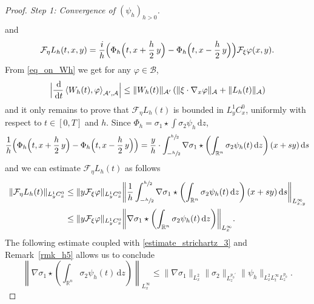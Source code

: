 \documentclass[10pt]{amsart}
\theoremstyle{definition}
\newcommand{\R}{\mathbb{R}}
\newcommand{\ud}{\, {\mathrm{d}}}
\begin{document}
\begin{proof}[Proof. Step 1: Convergence of $(\psi_{h})_{h>0}$]
\begin{align*}
\end{align*}
and
\[
\mathcal{F}_{\eta}L_{h}(t,x,y)=\frac{i}{h}\Bigl(\Phi_{h}\Bigl(t,x+\frac{h}{2}\,y\Bigr)-\Phi_{h}\Bigl(t,x-\frac{h}{2}\,y\Bigr)\Bigr)\mathcal{F}_{\xi}\varphi(x,y).
\]
From \eqref{eq_on_Wh} we get for any $\varphi\in\mathcal{B}$,
\[
\Bigl|\frac{\ud}{\ud t}\left\langle W_{h}(t),\varphi\right\rangle_{\mathcal{A}',\mathcal{A}}\Bigr|\leq\|W_{h}(t)\|_{\mathcal{A}'}\left(\|\xi\cdot\nabla_{x}\varphi\|_{\mathcal{A}}+\|L_{h}(t)\|_{\mathcal{A}}\right)
\]
and it only remains to prove that $\mathcal{F}_{\eta}L_{h}(t)$ is bounded in $L_{y}^{1}C_{x}^{0}$, uniformly with respect to $t\in[0,T]$ and $h$. Since $\Phi_{h}=\sigma_{1}\star\int\sigma_{2}\psi_{h}\ud z$,
\[
\frac{1}{h}\Bigl(\Phi_{h}\Bigl(t,x+\frac{h}{2}\,y\Bigr)-\Phi_{h}\Bigl(t,x-\frac{h}{2}\,y\Bigr)\Bigr)=\frac{y}{h}\cdot\int_{-\sfrac{h}{2}}^{\sfrac{h}{2}}\nabla\sigma_{1}\star\left(\int_{\R^{n}}\sigma_{2}\psi_{h}(t)\ud z\right)(x+sy)\ud s
\]
and we can estimate $\mathcal{F}_{\eta}L_{h}(t)$ as follows
\begin{align*}
\|\mathcal{F}_{\eta}L_{h}(t)\|_{L_{y}^{1}C_{x}^{0}}&\leq\|y\mathcal{F}_{\xi}\varphi\|_{L_{y}^{1}C_{x}^{0}}\biggl\|\frac{1}{h}\int_{-\sfrac{h}{2}}^{\sfrac{h}{2}}\nabla\sigma_{1}\star\left(\int_{\R^{n}}\sigma_{2}\psi_{h}(t)\ud z\right)(x+sy)\ud s\biggr\|_{L_{x,y}^{\infty}}\\
&\leq\|y\mathcal{F}_{\xi}\varphi\|_{L_{y}^{1}C_{x}^{0}}\biggl\|\nabla\sigma_{1}\star\left(\int_{\R^{n}}\sigma_{2}\psi_{h}(t)\ud z\right)\biggr\|_{L_{x}^{\infty}}.
\end{align*}
The following estimate coupled with \eqref{estimate_strichartz_3} and Remark~\ref{rmk_h5} allows us to conclude
\[
\left\|\nabla\sigma_{1}\star\left(\int_{\R^{n}}\sigma_{2}\psi_{h}(t)\ud z\right)\right\|_{L_{x}^{\infty}}\leq\|\nabla\sigma_{1}\|_{L_{x}^{2}}\|\sigma_{2}\|_{L_{z}^{p_{0}'}}\|\psi_{h}\|_{L_{x}^{2}L_{t}^{\infty}L_{z}^{p_{0}}}.
\]


\end{proof}
\end{document}
